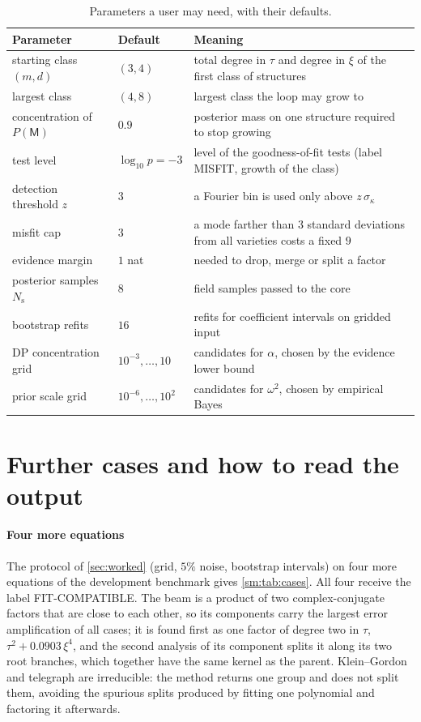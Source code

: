 \documentclass[11pt]{article}
\theoremstyle{plain}
\theoremstyle{definition}
\theoremstyle{remark}
\newcommand{\sigbin}{\sigma_{\kappa}}       %
\newcommand{\Nsamp}{N_{\mathrm s}}          %
\newcommand{\Mfit}{\mathsf{M}}              %
\newcommand{\lab}[1]{\textsf{#1}}           %
\newcommand{\FC}{\lab{FIT-COMPATIBLE}}
\newcommand{\MIS}{\lab{MISFIT}}
\begin{document}
\begin{table}[htbp]
\centering\small
\caption{Parameters a user may need, with their defaults.}\label{sm:tab:params}
\begin{tabularx}{\linewidth}{@{}l l X@{}}
\toprule
Parameter & Default & Meaning\\
\midrule
starting class $(m,d)$ & $(3,4)$ & total degree in $\tau$ and degree in $\xi$ of the first class of structures\\
largest class & $(4,8)$ & largest class the loop may grow to\\
concentration of $P(\Mfit)$ & $0.9$ & posterior mass on one structure required to stop growing\\
test level & $\log_{10}p=-3$ & level of the goodness-of-fit tests (label \MIS, growth of the class)\\
detection threshold $z$ & $3$ & a Fourier bin is used only above $z\,\sigbin$\\
misfit cap & $3$ & a mode farther than $3$ standard deviations from all varieties costs a fixed $9$\\
evidence margin & $1$ nat & needed to drop, merge or split a factor\\
posterior samples $\Nsamp$ & $8$ & field samples passed to the core\\
bootstrap refits & $16$ & refits for coefficient intervals on gridded input\\
DP concentration grid & $10^{-3},\dots,10$ & candidates for $\alpha$, chosen by the evidence lower bound\\
prior scale grid & $10^{-6},\dots,10^{2}$ & candidates for $\omega^2$, chosen by empirical Bayes\\
\bottomrule
\end{tabularx}
\end{table}

\section{Further cases and how to read the output}\label{sm:cases}
\paragraph{Four more equations} The protocol of \cref{sec:worked} (grid, $5\%$ noise, bootstrap intervals) on four more
equations of the development benchmark gives \cref{sm:tab:cases}. All four receive the label \FC. The beam is a product of
two complex-conjugate factors that are close to each other, so its components carry the largest error amplification of
all cases; it is found first as one factor of degree two in $\tau$, $\tau^2+0.0903\,\xi^4$, and the second analysis of
its component splits it along its two root branches, which together have the same kernel as the parent. Klein--Gordon
and telegraph are irreducible: the method returns one group and does not split them, avoiding the spurious splits
produced by fitting one polynomial and factoring it afterwards.
\end{document}
